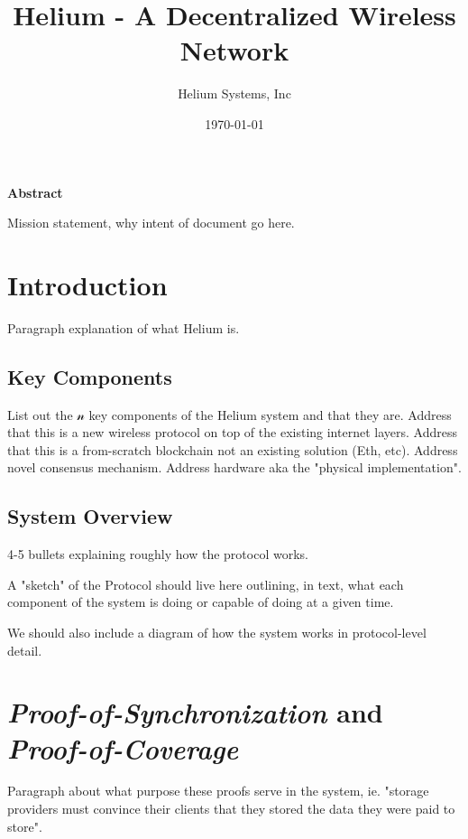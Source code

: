 \documentclass[a4paper,12pt]{article}
\begin{document}
\title{Helium - A Decentralized Wireless Network}
\author{Helium Systems, Inc}
\date{\today}
\maketitle

{\large \textbf{Abstract}}\newline

Mission statement, why  intent of document go here.\newpage

\tableofcontents
\newpage

\section{Introduction}

Paragraph explanation of what Helium is.

\subsection{Key Components}

List out the $\mathcal{n}$ key components of the Helium system and that they are. Address that this is a new wireless protocol on top of the existing internet layers. Address that this is a from-scratch blockchain not an existing solution (Eth, etc). Address novel consensus mechanism. Address hardware aka the "physical implementation".

\subsection{System Overview}

4-5 bullets explaining roughly how the protocol works.\newline

A "sketch" of the Protocol should live here outlining, in text, what each component of the system is doing or capable of doing at a given time.\newline

We should also include a diagram of how the system works in protocol-level detail.

\section{\textit{Proof-of-Synchronization} and \textit{Proof-of-Coverage}}

Paragraph about what purpose these proofs serve in the system, ie. "storage providers must convince their clients that they stored the data they were paid to store".
\end{document}
